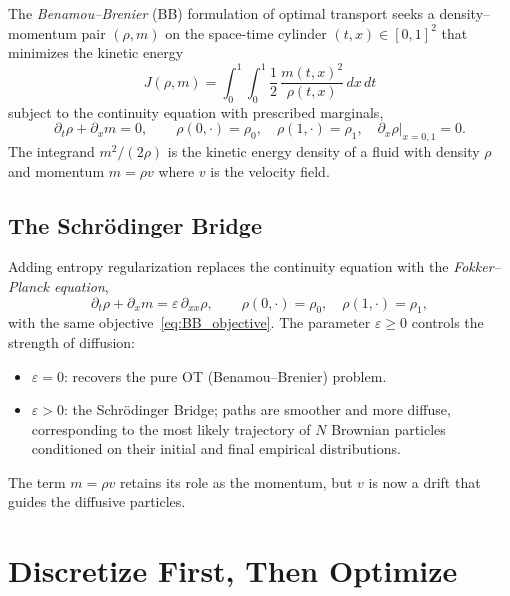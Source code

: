 \documentclass[11pt]{article}
\begin{document}
The \emph{Benamou--Brenier} (BB) formulation of optimal transport seeks a
density--momentum pair $(\rho, m)$ on the space-time cylinder
$(t,x) \in [0,1]^2$ that minimizes the kinetic energy
\begin{equation}
  J(\rho, m)
  = \int_0^1 \int_0^1 \frac{1}{2}\,\frac{m(t,x)^2}{\rho(t,x)}\,dx\,dt
  \label{eq:BB_objective}
\end{equation}
subject to the continuity equation with prescribed marginals,
\begin{equation}
  \partial_t \rho + \partial_x m = 0,
  \qquad
  \rho(0,\cdot) = \rho_0,\quad
  \rho(1,\cdot) = \rho_1,\quad
  \partial_x \rho\big|_{x=0,1} = 0.
  \label{eq:continuity}
\end{equation}
The integrand $m^2/(2\rho)$ is the kinetic energy density of a fluid with
density $\rho$ and momentum $m = \rho v$ where $v$ is the velocity field.

\subsection{The Schr\"{o}dinger Bridge}

Adding entropy regularization replaces the continuity equation with the
\emph{Fokker--Planck equation},
\begin{equation}
  \partial_t \rho + \partial_x m = \varepsilon\,\partial_{xx}\rho,
  \qquad
  \rho(0,\cdot) = \rho_0,\quad \rho(1,\cdot) = \rho_1,
  \label{eq:FP}
\end{equation}
with the same objective~\eqref{eq:BB_objective}.  The parameter
$\varepsilon \geq 0$ controls the strength of diffusion:
\begin{itemize}
  \item $\varepsilon = 0$: recovers the pure OT (Benamou--Brenier) problem.
  \item $\varepsilon > 0$: the Schr\"{o}dinger Bridge; paths are smoother
        and more diffuse, corresponding to the most likely trajectory of
        $N$ Brownian particles conditioned on their initial and final
        empirical distributions.
\end{itemize}
The term $m = \rho v$ retains its role as the momentum, but $v$ is now a
drift that guides the diffusive particles.

\section{Discretize First, Then Optimize}
\end{document}
